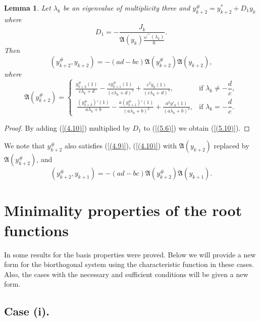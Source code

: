 \documentclass[pdflatex,sn-mathphys-num]{sn-jnl}%
\theoremstyle{thmstyleone}%
\theoremstyle{thmstyletwo}%
\theoremstyle{thmstylethree}%
\newtheorem{lem}[thm]{Lemma}
\theoremstyle{definition}
\theoremstyle{remark}
\numberwithin{equation}{section}
\begin{document}
\begin{lem}
Let $\lambda_k$ be an eigenvalue of multiplicity three and
$y^{\#}_{k+2}=y^{*}_{k+2}+D_{1}y_{k}$
where
\begin{equation}
    D_1 =-\frac{J_k}{\mathfrak{A}(y_k)\frac{\omega^{\prime\prime\prime}(\lambda_k)}{6}}. \label{(5.9)}
\end{equation}
Then 
\begin{equation}
(y_{k+2}^\#, y_{k+2}) =-(ad-bc)\mathfrak{A}(y_{k+2}^\#)\mathfrak{A}(y_{k+2}), \label{(5.10)}
\end{equation}
where
\begin{equation}
\mathfrak{A}(y^{\#}_{k+2}) =
\begin{cases}
\displaystyle  
\frac{y^{\#}_{k + 2}(1)}{c\lambda_{k} + d} - \frac{cy^{\#}_{k+1}(1)}{\left( c\lambda_{k} + d \right)^{2}}
+\frac{c^2y_{k}(1)}{\left( c\lambda_{k} + d \right)^{3}}, 
& \text{if } \lambda_k \neq -\dfrac{d}{c}, \\[10pt]
\displaystyle \ 
\frac{(y^{\#}_{k + 2})'(1)}{a\lambda_{k} + b} - \frac{a(y^{\#}_{k+1})'(1)}{\left( a\lambda_{k} + b \right)^{2}}
+\frac{a^2y'_{k}(1)}{\left( a\lambda_{k} + b\right)^{3}}, 
& \text{if }  \lambda_k = -\dfrac{d}{c}.
\end{cases}\label{(5.5.3)}  
\end{equation}
\end{lem}

\begin{proof} By adding (\ref{(4.10)}) multiplied by $D_1$ to (\ref{(5.6)}) we obtain (\ref{(5.10)}).
\end{proof}
We note that $y^{\#}_{k+2}$ also satisfies (\ref{(4.9)}), (\ref{(4.10)}) with  $\mathfrak{A}(y_{k+2})$ replaced by $\mathfrak{A}(y_{k+2}^\#)$, and 
\begin{equation}
(y_{k+2}^\#, y_{k+1}) =-(ad-bc)\mathfrak{A}(y_{k+2}^\#)\mathfrak{A}(y_{k+1}). \label{(5.11)}
\end{equation}
\section{Minimality properties of the root functions}
In \cite{aliyev5} some results for the basis properties were proved.  Below we will provide a new form for the biorthogonal system using the characteristic function in these cases. Also, the cases with the necessary and sufficient conditions will be given a new form.
\subsection{Case (i).}
\end{document}
